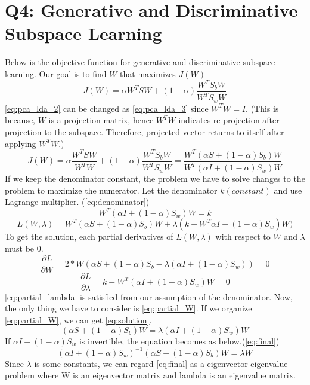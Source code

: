 \section{Q4: Generative and Discriminative Subspace Learning}
\label{subsec:Q4}
\label{sec:intro}
Below is the objective function for generative and discriminative subspace learning. Our goal is to find $W$ that maximizes $J(W)$
\begin{equation}
	J(W) = \alpha W^TSW+(1-\alpha) \frac{W^TS_bW}{W^TS_wW}
	\label{eq:pca_lda_2}
\end{equation}
\cref{eq:pca_lda_2} can be changed as \cref{eq:pca_lda_3} since $W^TW=I$. (This is because, $W$ is a projection matrix, hence $W^TW$ indicates re-projection after projection to the subspace. Therefore, projected vector returns to itself after applying $W^TW$.)
\begin{equation}
	J(W) = \alpha \frac{W^TSW}{W^TW}+(1-\alpha) \frac{W^TS_bW}{W^TS_wW}
	= \frac{W^T(\alpha S + (1-\alpha)S_b)W}{W^T(\alpha I + (1-\alpha)S_w)W}
	\label{eq:pca_lda_3}
\end{equation}
If we keep the denominator constant, the problem we have to solve changes to the problem to maximize the numerator. Let the denominator $k(constant)$ and use Lagrange-multiplier. (\cref{eq:denominator})
\begin{equation}
	W^T(\alpha I + (1-\alpha)S_w)W = k
	\label{eq:denominator}
\end{equation}
\begin{equation}
	L(W,\lambda)=W^T(\alpha S + (1-\alpha)S_b)W
	+ \lambda(k-W^T\alpha I + (1-\alpha)S_w)W)
	\label{eq:lagrange}
\end{equation}
To get the solution, each partial derivatives of $L(W,\lambda)$ with respect to $W$ and $\lambda$ must be 0.
\begin{equation}
	\frac{\partial L}{\partial W} = 2*W(\alpha S+(1-\alpha)S_b
	-\lambda(\alpha I+(1-\alpha)S_w))=0
	\label{eq:partial_W}
\end{equation}
\begin{equation}
	\frac{\partial L}{\partial \lambda} = k - W^T(\alpha I+(1-\alpha)S_w)W=0
	\label{eq:partial_lambda}
\end{equation}
\cref{eq:partial_lambda} is satisfied from our assumption of the denominator. Now, the only thing we have to consider is \cref{eq:partial_W}. If we organize \cref{eq:partial_W}, we can get \cref{eq:solution}.
\begin{equation}
	(\alpha S+(1-\alpha)S_b)W = \lambda (\alpha I + (1-\alpha)S_w)W
	\label{eq:solution}
\end{equation}
If $\alpha I + (1-\alpha)S_w$ is invertible, the equation becomes as below.(\cref{eq:final})
\begin{equation}
	(\alpha I + (1-\alpha)S_w)^{-1}(\alpha S+(1-\alpha)S_b)W = \lambda W
	\label{eq:final}
\end{equation}
Since $\lambda$ is some constants, we can regard \cref{eq:final} as a eigenvector-eigenvalue problem where W is an eigenvector matrix and lambda is an eigenvalue matrix.\\

